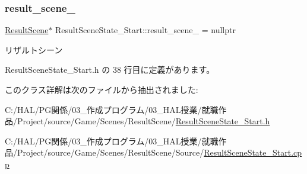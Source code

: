 \subsubsection{\texorpdfstring{result\+\_\+scene\+\_\+}{result\_scene\_}}
{\footnotesize\ttfamily \mbox{\hyperlink{class_result_scene}{Result\+Scene}}$\ast$ Result\+Scene\+State\+\_\+\+Start\+::result\+\_\+scene\+\_\+ = nullptr\hspace{0.3cm}{\ttfamily [private]}}



リザルトシーン 



 Result\+Scene\+State\+\_\+\+Start.\+h の 38 行目に定義があります。



このクラス詳解は次のファイルから抽出されました\+:\begin{DoxyCompactItemize}
\item 
C\+:/\+H\+A\+L/\+P\+G関係/03\+\_\+作成プログラム/03\+\_\+\+H\+A\+L授業/就職作品/\+Project/source/\+Game/\+Scenes/\+Result\+Scene/\mbox{\hyperlink{_result_scene_state___start_8h}{Result\+Scene\+State\+\_\+\+Start.\+h}}\item 
C\+:/\+H\+A\+L/\+P\+G関係/03\+\_\+作成プログラム/03\+\_\+\+H\+A\+L授業/就職作品/\+Project/source/\+Game/\+Scenes/\+Result\+Scene/\+Source/\mbox{\hyperlink{_result_scene_state___start_8cpp}{Result\+Scene\+State\+\_\+\+Start.\+cpp}}\end{DoxyCompactItemize}
